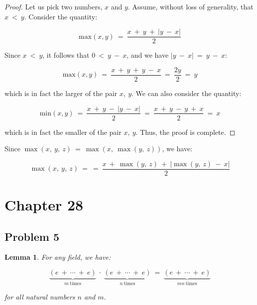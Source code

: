 \documentclass[10pt, oneside]{article}
\newtheorem{lem}{Lemma}
\begin{document}
\begin{proof}
Let us pick two numbers, $x$ and $y$. Assume, without loss of generality, that $x \ < \ y$. Consider the quantity:

$$\text{max} (x,  y) \ = \ \frac{x \ + \ y \ + \ |y \ - \ x|}{2}$$

Since $x \ < \ y$, it follows that $0 \ < \ y \ - \ x$, and we have $|y \ - \ x| \ = \ y \ - \ x$:

$$\text{max} (x,  y) \ = \ \frac{x \ + \ y \ + \ y \ - \ x}{2} \ = \ \frac{2y}{2} \ = \ y$$

which is in fact the larger of the pair $x, \ y$. We can also consider the quantity:

$$\text{min} (x,  y) \ = \ \frac{x \ + \ y \ - \ |y \ - \ x|}{2} \ = \ \frac{x \ + \ y \ - \  y \ + \ x}{2} \ = \ x$$

which is in fact the smaller of the pair $x, \ y$. Thus, the proof is complete.
\end{proof}

\newline


Since $\max(x, \ y, \ z) \ = \ \max(x, \ \max(y, \ z))$, we have:

$$\max(x, \ y, \ z) \ = \ = \ \frac{x \ + \ \max(y, \ z) \ + \ |\max(y, \ z) \ - \ x|}{2}$$

\section{Chapter 28}

\subsection{Problem 5}

\begin{lem}
	For any field, we have:

	$$\underbrace{(e \ + \ \cdots \ + \ e)}_{m \ \text{times}} \ \cdot \ \underbrace{(e \ + \ 
	\cdots \ + \ e)}_{n \ \text{times}} \ = \ \underbrace{(e \ + \ \cdots \ + \ e)}_{mn \ \text{times}}$$

	for all natural numbers $n$ and $m$.
\end{lem}
\end{document}
